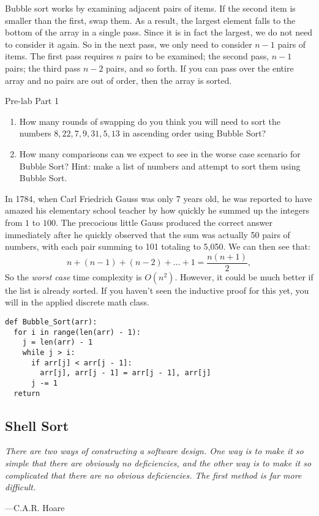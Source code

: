\documentclass[11pt]{article}
\begin{document}
\noindent Bubble sort works by examining adjacent pairs of items. If the second
item is smaller than the first, swap them. As a result, the largest element
falls to the bottom of the array in a single pass. Since it is in fact the
largest, we do not need to consider it again. So in the next pass, we only need
to consider $n-1$ pairs of items. The first pass requires $n$ pairs to be
examined; the second pass, $n-1$ pairs; the third pass $n-2$ pairs, and so
forth. If you can pass over the entire array and no pairs are out of order, then
the array is sorted.


\medskip 
\begin{prelab}{Pre-lab Part 1}
  \begin{enumerate} 
    \item How many rounds of swapping do you think you will need to
	  sort the numbers ${8, 22, 7, 9, 31, 5, 13}$ in ascending order
          using Bubble Sort? 
    \item How many comparisons can we expect to see in the worse case scenario 
	  for Bubble Sort? Hint: make a list of numbers and attempt to sort them
	  using Bubble Sort.
  \end{enumerate} 
\end{prelab}


In 1784, when Carl Friedrich Gauss was only 7 years old, he was reported to have
amazed his elementary school teacher by how quickly he summed up the integers
from $1$ to $100$.  The precocious little Gauss produced the correct answer
immediately after he quickly observed that the sum was actually 50 pairs of
numbers, with each pair summing to 101 totaling to 5,050. We can then see that:
$$
n+(n-1)+(n-2) + \ldots + 1 = \frac{n(n+1)}{2},
$$
So the \emph{worst case} time complexity is $O(n^2)$. However, it could be much
better if the list is already sorted. If you haven't seen the inductive proof
for this yet, you will in the applied discrete math class.

\begin{lstlisting}[title=Bubble Sort (pseudocode)]
def Bubble_Sort(arr):
  for i in range(len(arr) - 1):
    j = len(arr) - 1
    while j > i:
      if arr[j] < arr[j - 1]:
        arr[j], arr[j - 1] = arr[j - 1], arr[j]
      j -= 1
  return
\end{lstlisting}

\subsection{Shell Sort} \epigraph{\emph{There are two ways of constructing a
        software design. One way is to make it so simple that there are
        obviously no deficiencies, and the other way is to make it so
        complicated that there are no obvious deficiencies. The first method is
        far more difficult.  }}{---C.A.R. Hoare}
\end{document}
